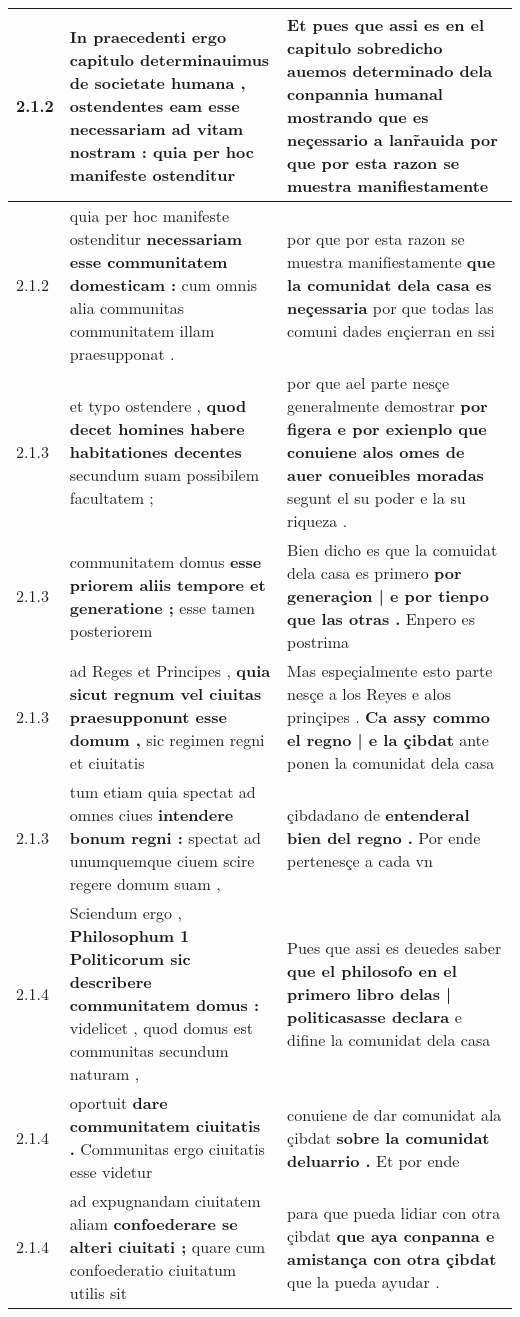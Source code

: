 \begin{tabular}{|p{1cm}|p{6.5cm}|p{6.5cm}|}
2.1.2 & In praecedenti ergo capitulo determinauimus de societate humana , \textbf{ ostendentes eam esse necessariam ad vitam nostram : } quia per hoc manifeste ostenditur & Et pues que assi es en el capitulo sobredicho auemos determinado dela conpannia humanal \textbf{ mostrando que es neçessario a lanr̃auida } por que por esta razon se muestra manifiestamente \\\hline
2.1.2 & quia per hoc manifeste ostenditur \textbf{ necessariam esse communitatem domesticam : } cum omnis alia communitas communitatem illam praesupponat . & por que por esta razon se muestra manifiestamente \textbf{ que la comunidat dela casa es neçessaria } por que todas las comuni dades ençierran en ssi \\\hline
2.1.3 & et typo ostendere , \textbf{ quod decet homines habere habitationes decentes } secundum suam possibilem facultatem ; & por que ael parte nesçe generalmente demostrar \textbf{ por figera e por exienplo que conuiene alos omes de auer conueibles moradas } segunt el su poder e la su riqueza . \\\hline
2.1.3 & communitatem domus \textbf{ esse priorem aliis tempore et generatione ; } esse tamen posteriorem & Bien dicho es que la comuidat dela casa es primero \textbf{ por generaçion | e por tienpo que las otras . } Enpero es postrima \\\hline
2.1.3 & ad Reges et Principes , \textbf{ quia sicut regnum vel ciuitas praesupponunt esse domum , } sic regimen regni et ciuitatis & Mas espeçialmente esto parte nesçe a los Reyes e alos prinçipes . \textbf{ Ca assy commo el regno | e la çibdat } ante ponen la comunidat dela casa \\\hline
2.1.3 & tum etiam quia spectat ad omnes ciues \textbf{ intendere bonum regni : } spectat ad unumquemque ciuem scire regere domum suam , & çibdadano de \textbf{ entenderal bien del regno . } Por ende pertenesçe a cada vn \\\hline
2.1.4 & Sciendum ergo , \textbf{ Philosophum 1 Politicorum sic describere communitatem domus : } videlicet , quod domus est communitas secundum naturam , & Pues que assi es deuedes saber \textbf{ que el philosofo en el primero libro delas | politicasasse declara } e difine la comunidat dela casa \\\hline
2.1.4 & oportuit \textbf{ dare communitatem ciuitatis . } Communitas ergo ciuitatis esse videtur & conuiene de dar comunidat ala çibdat \textbf{ sobre la comunidat deluarrio . } Et por ende \\\hline
2.1.4 & ad expugnandam ciuitatem aliam \textbf{ confoederare se alteri ciuitati ; } quare cum confoederatio ciuitatum utilis sit & para que pueda lidiar con otra çibdat \textbf{ que aya conpanna e amistança con otra çibdat } que la pueda ayudar . \\\hline

\end{tabular}
